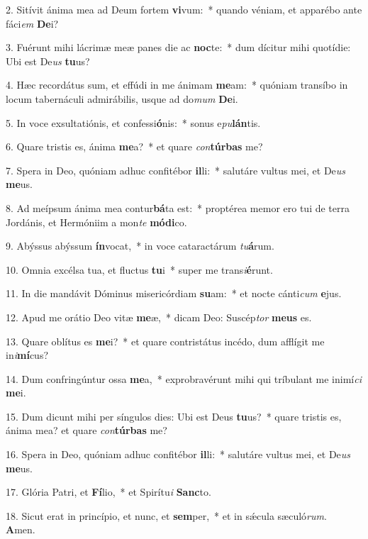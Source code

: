 2. Sitívit ánima mea ad Deum fortem \textbf{vi}vum:~*  quando véniam, et apparébo ante fáci\textit{em} \textbf{De}i?\

3. Fuérunt mihi lácrimæ meæ panes die ac \textbf{noc}te:~*  dum dícitur mihi quotídie: Ubi est De\textit{us} \textbf{tu}us?\

4. Hæc recordátus sum, et effúdi in me ánimam \textbf{me}am:~*  quóniam transíbo in locum tabernáculi admirábilis, usque ad do\textit{mum} \textbf{De}i.\

5. In voce exsultatiónis, et confessi\textbf{ó}nis:~*  sonus e\textit{pu}\textbf{lán}tis.\

6. Quare tristis es, ánima \textbf{me}a?~*  et quare \textit{con}\textbf{túr}\textbf{bas} me?\

7. Spera in Deo, quóniam adhuc confitébor \textbf{il}li:~*  salutáre vultus mei, et De\textit{us} \textbf{me}us.\

8. Ad meípsum ánima mea contur\textbf{bá}ta est:~*  proptérea memor ero tui de terra Jordánis, et Hermóniim a mon\textit{te} \textbf{mó}\textbf{di}co.\

9. Abýssus abýssum \textbf{ín}vocat,~*  in voce cataractárum \textit{tu}\textbf{á}rum.\

10. Omnia excélsa tua, et fluctus \textbf{tu}i~*  super me trans\textit{i}\textbf{é}runt.\

11. In die mandávit Dóminus misericórdiam \textbf{su}am:~*  et nocte cánti\textit{cum} \textbf{e}jus.\

12. Apud me orátio Deo vitæ \textbf{me}æ,~*  dicam Deo: Suscép\textit{tor} \textbf{me}\textbf{us} es.\

13. Quare oblítus es \textbf{me}i?~*  et quare contristátus incédo, dum afflígit me in\textit{i}\textbf{mí}cus?\

14. Dum confringúntur ossa \textbf{me}a,~*  exprobravérunt mihi qui tríbulant me inimí\textit{ci} \textbf{me}i.\

15. Dum dicunt mihi per síngulos dies: Ubi est Deus \textbf{tu}us?~*  quare tristis es, ánima mea? et quare \textit{con}\textbf{túr}\textbf{bas} me?\

16. Spera in Deo, quóniam adhuc confitébor \textbf{il}li:~*  salutáre vultus mei, et De\textit{us} \textbf{me}us.\

17. Glória Patri, et \textbf{Fí}lio,~*  et Spirítu\textit{i} \textbf{Sanc}to.\

18. Sicut erat in princípio, et nunc, et \textbf{sem}per,~*  et in sǽcula sæculó\textit{rum}. \textbf{A}men.\

